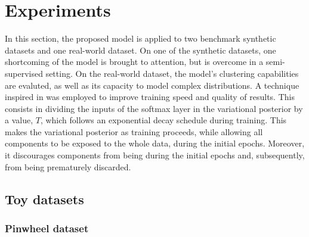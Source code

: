 \section{Experiments}
\label{section:experiments}

In this section, the proposed model is applied to two benchmark synthetic datasets
and one real-world dataset. On one of the synthetic datasets, one shortcoming of
the model is brought to attention, but is overcome
in a semi-supervised setting. On the real-world dataset, the model's clustering
capabilities are evaluted, as well as its capacity to model complex distributions.
A technique inspired in \autocite{mixae} was employed to improve training
speed and quality of results. This consists in dividing the inputs of the softmax layer in
the variational posterior by a  value, $T$, which follows
an exponential decay schedule during training. This makes the
variational posterior  as training proceeds, while allowing all
components to be exposed to the whole data, during the initial epochs.
Moreover, it discourages components from being  during the initial epochs
and, subsequently, from being prematurely discarded.

\subsection{Toy datasets}
\subsubsection{Pinwheel dataset}

